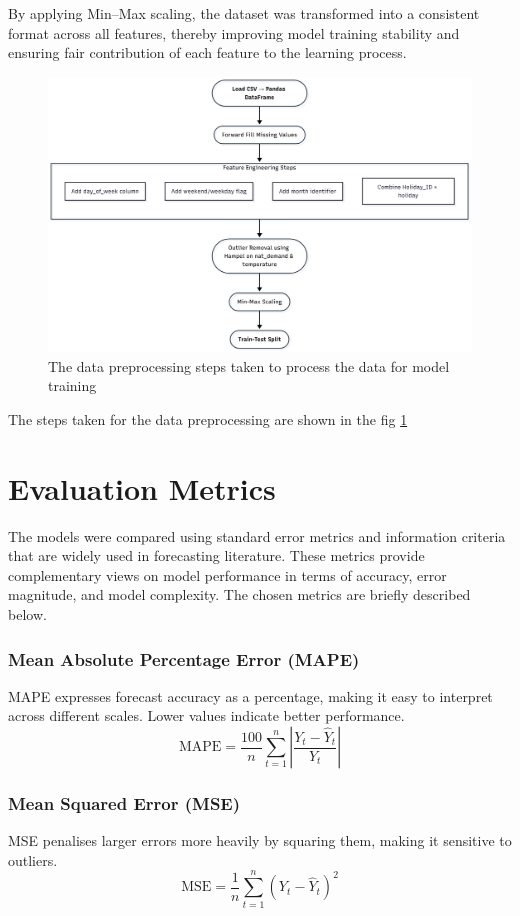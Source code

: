 By applying Min–Max scaling, the dataset was transformed into a consistent format across all features, thereby improving model training stability and ensuring fair contribution of each feature to the learning process.
\begin{figure}[h]
	\centering
	\includegraphics[width=0.7\linewidth]{Chapters/images/preprocess}
	\caption{The data preprocessing steps taken to process the data for model training}
	\label{fig:preprocessing}
\end{figure}

The steps taken for the data preprocessing are shown in the fig \ref{fig:preprocessing} 

\section{Evaluation Metrics}
The models were compared using standard error metrics and information criteria that are widely used in forecasting literature. These metrics provide complementary views on model performance in terms of accuracy, error magnitude, and model complexity. The chosen metrics are briefly described below. 

\subsubsection{Mean Absolute Percentage Error (MAPE)} 
MAPE expresses forecast accuracy as a percentage, making it easy to interpret across different scales. Lower values indicate better performance.  
\[
\text{MAPE} = \frac{100}{n}\sum_{t=1}^{n} \left| \frac{Y_t - \hat{Y}_t}{Y_t} \right|
\]

\subsubsection{Mean Squared Error (MSE)} 
MSE penalises larger errors more heavily by squaring them, making it sensitive to outliers.  
\[
\text{MSE} = \frac{1}{n}\sum_{t=1}^{n} (Y_t - \hat{Y}_t)^2
\]

